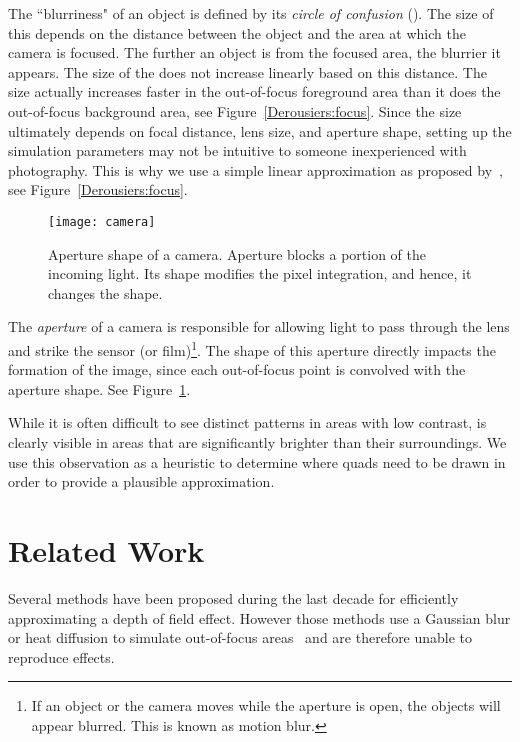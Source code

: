 The ``blurriness" of an object is defined by its \emph{circle of confusion} (\coc). The size of this \coc depends on the distance between the object and the area at which the camera is focused. The further an object is from the focused area, the blurrier it appears. The size of the \coc does not increase linearly based on this distance. The size actually increases faster in the out-of-focus foreground area than it does the out-of-focus background area, see Figure~\ref{Derousiers:focus}. Since the \coc size ultimately depends on focal distance, lens size, and aperture shape, setting up the simulation parameters may not be intuitive to someone inexperienced with photography. This is why we use a simple linear approximation as proposed by~\cite{Hammon07}, see Figure~\ref{Derousiers:focus}.

	\begin{figure}[htb]\centering
	\texttt{[image: camera]}
	\caption{Aperture shape of a camera. Aperture blocks a portion of the incoming light. Its shape modifies the pixel integration, and hence, it changes the \bokeh shape. }
	\label{Derousiers:camera}
	\end{figure}

The \textit{aperture} of a camera is responsible for allowing light to pass through the lens and strike the sensor (or film)\footnote{If an object or the camera moves while the aperture is open, the objects will appear blurred. This is known as motion blur.}. The shape of this aperture directly impacts the formation of the image, since each out-of-focus point is convolved with the aperture shape. See Figure~\ref{Derousiers:camera}.

While it is often difficult to see distinct \bokeh patterns in areas with low contrast, \bokeh is clearly visible in areas that are significantly brighter than their surroundings. We use this observation as a heuristic to determine where \bokeh quads need to be drawn in order to provide a plausible approximation.

\section{Related Work}\label{Derousiers:RelativeWork}

Several methods have been proposed during the last decade for efficiently approximating a depth of field effect. However those methods use a Gaussian blur or heat diffusion to simulate out-of-focus areas~\cite{Hammon07,Kosloff07} and are therefore unable to reproduce \bokeh effects.

